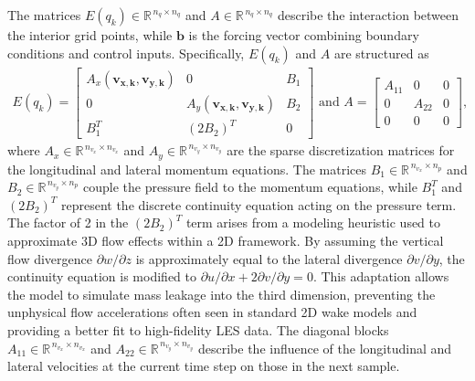 The matrices $E(q_k) \in \mathbb{R}^{\,n_{q} \times n_{q}}$ and $A \in \mathbb{R}^{\,n_{q} \times n_{q}}$ describe the interaction between the interior grid points, while $\bm{b}$ is the forcing vector combining boundary conditions and control inputs. Specifically, $E(q_k)$ and  $A$ are structured as
\begin{align} \label{eq:AGrid}
    E(q_k) =
    \begin{bmatrix}
        A_x(\bm{v_{x,k}},\bm{v_{y,k}}) & 0   & B_1 \\
        0   & A_y(\bm{v_{x,k}},\bm{v_{y,k}}) & B_2 \\
        B_1^T   & (2 B_2)^T   & 0
    \end{bmatrix} \text{ and } 
    A =
    \begin{bmatrix}
        A_{11} & 0   & 0 \\
        0   & A_{22} &0 \\
        0   & 0   & 0
    \end{bmatrix},
\end{align}
where $A_x \in \mathbb{R}^{\,n_{v_x} \times n_{v_x}}$ and $A_y \in \mathbb{R}^{\,n_{v_y} \times n_{v_y}}$ are the sparse discretization matrices for the longitudinal and lateral momentum equations.  The matrices $B_1 \in \mathbb{R}^{\,n_{v_x} \times n_p}$ and $B_2 \in \mathbb{R}^{\,n_{v_y} \times n_p}$ couple the pressure field to the momentum equations, while $B_1^T$ and $(2 B_2)^T$ represent the discrete continuity equation acting on the pressure term. The factor of 2 in the $(2B_2)^T$ term arises from a modeling heuristic used to approximate 3D flow effects within a 2D framework. By assuming the vertical flow divergence $\partial w / \partial z$ is approximately equal to the lateral divergence $\partial v / \partial y$, the continuity equation is modified to $\partial u / \partial x + 2\partial v / \partial y = 0$. This adaptation allows the model to simulate mass leakage into the third dimension, preventing the unphysical flow accelerations often seen in standard 2D wake models and providing a better fit to high-fidelity LES data. The diagonal blocks $A_{11} \in \mathbb{R}^{\,n_{v_x} \times n_{v_x}}$ and $A_{22} \in \mathbb{R}^{\,n_{v_y} \times n_{v_y}}$ describe the influence of the longitudinal and lateral velocities at the current time step on those in the next sample.

